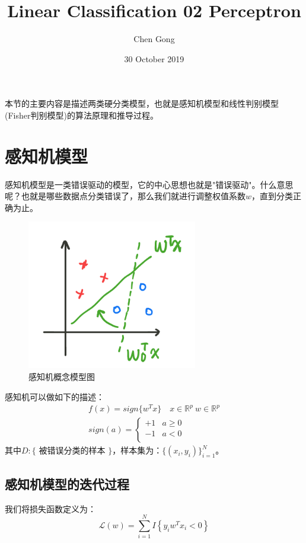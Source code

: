 \documentclass[a4paper]{article}
\title{Linear Classification 02 Perceptron}
\author{Chen Gong}
\date{30 October 2019}
\begin{document}
\maketitle
本节的主要内容是描述两类硬分类模型，也就是感知机模型和线性判别模型(Fisher判别模型)的算法原理和推导过程。

\section{感知机模型}
感知机模型是一类错误驱动的模型，它的中心思想也就是"错误驱动"。什么意思呢？也就是哪些数据点分类错误了，那么我们就进行调整权值系数$w$，直到分类正确为止。

\begin{figure}[H]
    \centering
    \includegraphics[width=.4\textwidth]{微信图片_20191030090710.png}
    \caption{感知机概念模型图}
    \label{fig:my_label_1}
\end{figure}

感知机可以做如下的描述：
\begin{gather}
    f(x)=sign\{ w^Tx \} \quad x\in \mathbb{R}^p \ w\in  \mathbb{R}^p \\
    sign(a)=
    \left\{
    \begin{array}{ll}
      +1 & a \geq 0 \\
      -1 & a < 0 \\
    \end{array}
    \right.
\end{gather}
其中$D:\{$ 被错误分类的样本 $\}$，样本集为：$\{(x_i,y_i)\}_{i=1}^N$。

\subsection{感知机模型的迭代过程}
我们将损失函数定义为：
\begin{equation}
    \mathcal{L}(w)=\sum_{i=1}^NI\left\{ y_iw^Tx_i < 0 \right\}
\end{equation}
\end{document}
